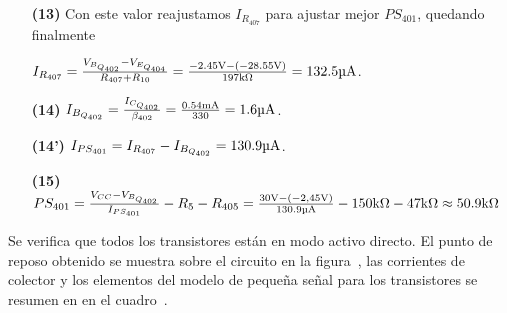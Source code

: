\begin{sloppypar}
\begin{enumerate}
\item[\textbf{(13)}] Con este valor reajustamos $I_{R_{407}}$ para ajustar mejor $PS_{401}$, quedando finalmente  

$I_{R_{407}} =\frac{V_{B_{Q_{402}}} - V_{E_{Q_{404}}} }{R_{407} + R_{10}}   = \frac{-2.45 \si[per-mode=symbol]{\volt} - (-28.55 \si[per-mode=symbol]{\volt})}{197 \si[per-mode=symbol]{\kilo\ohm}} = 132.5 \si[per-mode=symbol]{\micro\ampere} $.


\item[\textbf{(14)}] $I_{B_{Q_{402}}} = \frac{ I_{C_{Q_{402}}} }{ \beta_{402} } = \frac{ 0.54 \si[per-mode=symbol]{\milli\ampere} }{ 330 } = 1.6 \si[per-mode=symbol]{\micro\ampere}  $.


\item[\textbf{(14')}] $I_{PS_{401}} = I_{R_{407}} - I_{B_{Q_{402}}} = 130.9 \si[per-mode=symbol]{\micro\ampere} $.


\item[\textbf{(15)}] $PS_{401} = \frac{ V_{CC} - V_{B_{Q_{402}}} }{I_{PS_{401}} } - R_{5} - R_{405} =  \frac{ 30 \si[per-mode=symbol]{\volt} - (-2,45 \si[per-mode=symbol]{\volt} )}{130.9 \si[per-mode=symbol]{\micro\ampere} } - 150 \si[per-mode=symbol]{\kilo\ohm} - 47 \si[per-mode=symbol]{\kilo\ohm} \approx 50.9 \si[per-mode=symbol]{\kilo\ohm} $\\

\end{enumerate}

\end{sloppypar}

Se verifica que todos los transistores están en modo activo directo. El punto de reposo obtenido se muestra sobre el circuito en la figura~, las corrientes de colector y los elementos del modelo de pequeña señal para los transistores se resumen en en el cuadro~.


 
